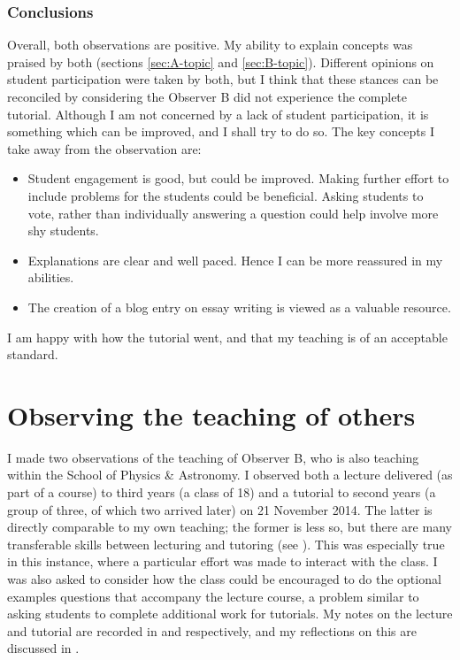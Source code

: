 \subsubsection{Conclusions}\label{sec:me-conclusions}

Overall, both observations are positive. My ability to explain concepts was praised by both (sections \ref{sec:A-topic} and \ref{sec:B-topic}). Different opinions on student participation were taken by both, but I think that these stances can be reconciled by considering the Observer B did not experience the complete tutorial. Although I am not concerned by a lack of student participation, it is something which can be improved, and I shall try to do so. The key concepts I take away from the observation are:
\begin{itemize}
\item Student engagement is good, but could be improved. Making further effort to include problems for the students could be beneficial. Asking students to vote, rather than individually answering a question could help involve more shy students.
\item Explanations are clear and well paced. Hence I can be more reassured in my abilities.
\item The creation of a blog entry on essay writing is viewed as a valuable resource.
\end{itemize}
I am happy with how the tutorial went, and that my teaching is of an acceptable standard.

\section{Observing the teaching of others}\label{sec:other}

I made two observations of the teaching of Observer B, who is also teaching within the School of Physics \& Astronomy. I observed both a lecture delivered (as part of a course) to third years (a class of 18) and a tutorial to second years (a group of three, of which two arrived later) on 21 November 2014. The latter is directly comparable to my own teaching; the former is less so, but there are many transferable skills between lecturing and tutoring (see ). This was especially true in this instance, where a particular effort was made to interact with the class. I was also asked to consider how the class could be encouraged to do the optional examples questions that accompany the lecture course, a problem similar to asking students to complete additional work for tutorials. My notes on the lecture and tutorial are recorded in  and  respectively, and my reflections on this are discussed in .


